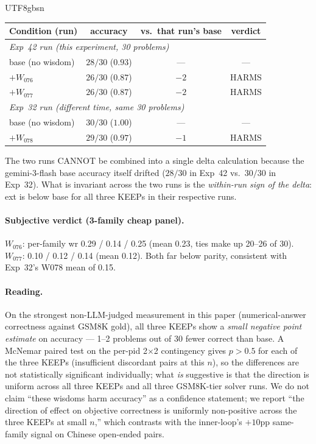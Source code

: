 \documentclass{article}
\begin{document}
\begin{CJK*}{UTF8}{gbsn}
\begin{center}\small
\begin{tabular}{l c c c}
  \toprule
  Condition (run) & accuracy & vs.\ that run's base & verdict \\
  \midrule
  \multicolumn{4}{l}{\emph{Exp~42 run (this experiment, 30 problems)}}\\
  \quad base (no wisdom)     & \(28/30\) (\(0.93\)) & --- & --- \\
  \quad \(+ W_{076}\)        & \(26/30\) (\(0.87\)) & \(-2\) & HARMS \\
  \quad \(+ W_{077}\)        & \(26/30\) (\(0.87\)) & \(-2\) & HARMS \\
  \midrule
  \multicolumn{4}{l}{\emph{Exp~32 run (different time, same 30 problems)}}\\
  \quad base (no wisdom)     & \(30/30\) (\(1.00\)) & --- & --- \\
  \quad \(+ W_{078}\)        & \(29/30\) (\(0.97\)) & \(-1\) & HARMS \\
  \bottomrule
\end{tabular}
\end{center}

The two runs CANNOT be combined into a single delta calculation
because the gemini-3-flash base accuracy itself drifted (\(28/30\)
in Exp~42 vs.\ \(30/30\) in Exp~32). What is invariant across the
two runs is the \emph{within-run sign of the delta}: ext is below
base for all three KEEPs in their respective runs.

\paragraph{Subjective verdict (3-family cheap panel).}
\(W_{076}\): per-family wr 0.29 / 0.14 / 0.25 (mean 0.23, ties
make up 20--26 of 30). \(W_{077}\): 0.10 / 0.12 / 0.14 (mean 0.12).
Both far below parity, consistent with Exp~32's W078 mean of 0.15.

\paragraph{Reading.} On the strongest non-LLM-judged measurement
in this paper (numerical-answer correctness against GSM8K gold),
all three KEEPs show a \emph{small negative point estimate} on
accuracy --- 1--2 problems out of 30 fewer correct than base.
A McNemar paired test on the per-pid 2\(\times\)2 contingency
gives \(p > 0.5\) for each of the three KEEPs (insufficient
discordant pairs at this \(n\)), so the differences are not
statistically significant individually; what \emph{is} suggestive
is that the direction is uniform across all three KEEPs and all
three GSM8K-tier solver runs. We do not claim ``these wisdoms
harm accuracy'' as a confidence statement; we report ``the
direction of effect on objective correctness is uniformly
non-positive across the three KEEPs at small \(n\),'' which
contrasts with the inner-loop's \(+10\)pp same-family signal
on Chinese open-ended pairs.


\end{CJK*}
\end{document}

